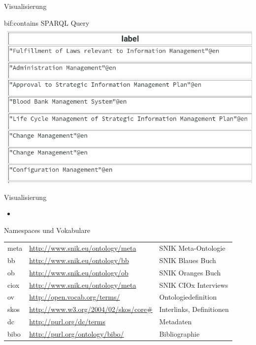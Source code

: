 \documentclass[14pt,aspectratio=1610]{beamer}
\begin{document}
\begin{frame}{Visualisierung}
\begin{block}{bif:contains SPARQL Query}
\centering\includegraphics[width=\textwidth,height=0.7\textheight,keepaspectratio]{img/bifcontains-result.png}
\end{block}
\end{frame}


\begin{frame}{Visualisierung}
\begin{block}{}
\begin{itemize}
\item 
\end{itemize}
\end{block}
\end{frame}

\begin{frame}{Namespaces und Vokabulare}
\small
\begin{tabular}{lll}
meta		&\url{http://www.snik.eu/ontology/meta}		&SNIK Meta-Ontologie\\
bb		&\url{http://www.snik.eu/ontology/bb}		&SNIK Blaues Buch\\
ob		&\url{http://www.snik.eu/ontology/ob}		&SNIK Oranges Buch\\
ciox		&\url{http://www.snik.eu/ontology/meta}		&SNIK CIOx Interviews\\
ov		&\url{http://open.vocab.org/terms/}		&Ontologiedefinition\\
skos		&\url{http://www.w3.org/2004/02/skos/core\#}	&Interlinks, Definitionen\\
dc		&\url{http://purl.org/dc/terms}			&Metadaten\\
bibo		&\url{http://purl.org/ontology/bibo/}		&Bibliographie\\
\end{tabular}
\end{frame}
\end{document}
